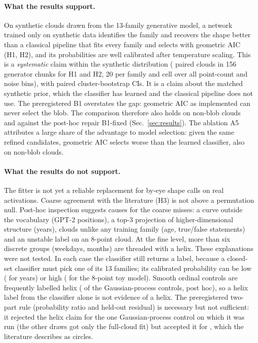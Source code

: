 
\paragraph{What the results support.} On synthetic clouds drawn from the 13-family generative model, a network trained only on synthetic data identifies the family and recovers the shape better than a classical pipeline that fits every family and selects with geometric AIC (H1, H2), and its probabilities are well calibrated after temperature scaling. This is a \emph{systematic} claim within the synthetic distribution (\nBone{} paired clouds in 156 generator chunks for H1 and H2, 20 per family and cell over all point-count and noise bins), with paired cluster-bootstrap CIs. It is a claim about the matched synthetic prior, which the classifier has learned and the classical pipeline does not use. The preregistered B1 overstates the gap: geometric AIC as implemented can never select the blob. The comparison therefore also holds on non-blob clouds and against the post-hoc repair B1-fixed (Sec.~\ref{sec:results}). The ablation A5 attributes a large share of the advantage to model selection: given the same refined candidates, geometric AIC selects worse than the learned classifier, also on non-blob clouds.

\paragraph{What the results do not support.} The fitter is not yet a reliable replacement for by-eye shape calls on real activations. Coarse agreement with the literature (H3) is not above a permutation null. Post-hoc inspection suggests causes for the coarse misses: a curve outside the vocabulary (GPT-2 positions), a top-3 projection of higher-dimensional structure (years), clouds unlike any training family (age, true/false statements) and an unstable label on an 8-point cloud. At the fine level, more than six discrete groups (weekdays, months) are threaded with a helix. These explanations were not tested. In each case the classifier still returns a label, because a closed-set classifier must pick one of its 13 families; its calibrated probability can be low (\pRsixllamayears{} for years) or high (\pRthreetmsneight{} for the 8-point toy model). Smooth ordinal controls are frequently labelled helix (\hfourGpHelix{} of the Gaussian-process controls, post hoc), so a helix label from the classifier alone is not evidence of a helix. The preregistered two-part rule (probability ratio and held-out residual) is necessary but not sufficient: it rejected the helix claim for the one Gaussian-process control on which it was run (the other draws got only the full-cloud fit) but accepted it for \helixRuleAccepted{}, which the literature describes as circles.


